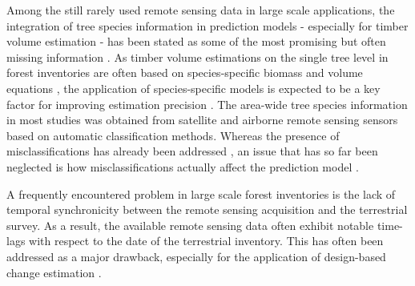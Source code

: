 Among the still rarely used remote sensing data in large scale applications, the integration of tree species information in prediction models - especially for timber volume estimation - has been stated as some of the most promising but often missing information \citep{koch2010, white2016}. As timber volume estimations on the single tree level in forest inventories are often based on species-specific biomass and volume equations \citep{husmann2017,zianis2005}, the application of species-specific models is expected to be a key factor for improving estimation precision \citep{white2016}.  The area-wide tree species information in most studies was obtained from satellite and airborne remote sensing sensors based on automatic classification methods. Whereas the presence of misclassifications has already been addressed \citep{latifi2012}, an issue that has so far been neglected is how misclassifications actually affect the prediction model \citep{gustafson2003}.\par

A frequently encountered problem in large scale forest inventories is the lack of temporal synchronicity between the remote sensing acquisition and the terrestrial survey. As a result, the available remote sensing data often exhibit notable time-lags with respect to the date of the terrestrial inventory. This has often been addressed as a major drawback, especially for the application of design-based change estimation \citep{massey2015b}.\par

